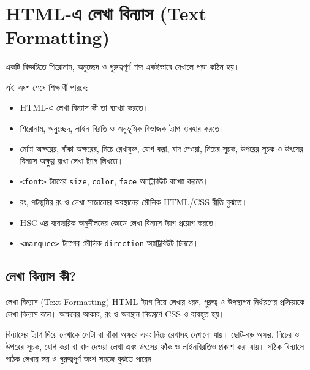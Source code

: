 ﻿%
\section{HTML-এ লেখা বিন্যাস (Text Formatting)}

একটি বিজ্ঞপ্তিতে শিরোনাম, অনুচ্ছেদ ও গুরুত্বপূর্ণ শব্দ একইভাবে দেখালে পড়া কঠিন হয়।



\begin{learningbox}
এই অংশ শেষে শিক্ষার্থী পারবে:
\begin{itemize}
\item HTML-এ লেখা বিন্যাস কী তা ব্যাখ্যা করতে।
\item শিরোনাম, অনুচ্ছেদ, লাইন বিরতি ও অনুভূমিক বিভাজক ট্যাগ ব্যবহার করতে।
\item মোটা অক্ষরের, বাঁকা অক্ষরের, নিচে রেখাযুক্ত, যোগ করা, বাদ দেওয়া, নিচের সূচক, উপরের সূচক ও উৎসের বিন্যাস অক্ষুণ্ণ রাখা লেখা ট্যাগ লিখতে।
\item \texttt{<font>} ট্যাগের \texttt{size}, \texttt{color}, \texttt{face} অ্যাট্রিবিউট ব্যাখ্যা করতে।
\item রং, পটভূমির রং ও লেখা সাজানোর অবস্থানের মৌলিক HTML/CSS রীতি বুঝতে।
\item HSC-এর ব্যবহারিক অনুশীলনের কোডে লেখা বিন্যাস ট্যাগ প্রয়োগ করতে।
\item \texttt{<marquee>} ট্যাগের মৌলিক \texttt{direction} অ্যাট্রিবিউট চিনতে।
\end{itemize}
\end{learningbox}



\subsection{লেখা বিন্যাস কী?}

\begin{definitionbox}{লেখা বিন্যাস (Text Formatting)}
HTML ট্যাগ দিয়ে লেখার ধরন, গুরুত্ব ও উপস্থাপন নির্ধারণের প্রক্রিয়াকে লেখা বিন্যাস বলে। অক্ষরের আকার, রং ও অবস্থান নিয়ন্ত্রণে CSS-ও ব্যবহৃত হয়।
\end{definitionbox}

বিন্যাসের ট্যাগ দিয়ে লেখাকে মোটা বা বাঁকা অক্ষরে এবং নিচে রেখাসহ দেখানো যায়। ছোট-বড় অক্ষর, নিচের ও উপরের সূচক, যোগ করা বা বাদ দেওয়া লেখা এবং উৎসের ফাঁক ও লাইনবিরতিও প্রকাশ করা যায়। সঠিক বিন্যাসে পাঠক লেখার স্তর ও গুরুত্বপূর্ণ অংশ সহজে বুঝতে পারেন।




